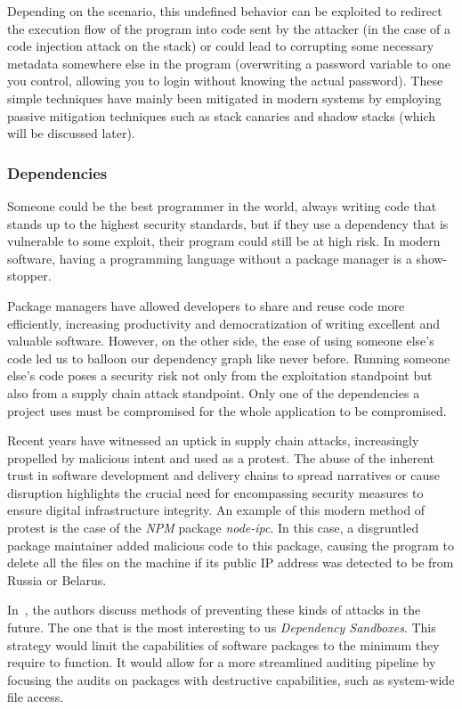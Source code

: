 \documentclass{article}
\begin{document}
Depending on the scenario, this undefined behavior can be exploited to redirect the execution flow of the program into code sent by the attacker (in the case of a code injection attack on the stack) or could lead to corrupting some necessary metadata somewhere else in the program (overwriting a password variable to one you control, allowing you to login without knowing the actual password). These simple techniques have mainly been mitigated in modern systems by employing passive mitigation techniques such as stack canaries and shadow stacks (which will be discussed later).

\subsubsection{Dependencies}%
Someone could be the best programmer in the world, always writing code that stands up to the highest security standards, but if they use a dependency that is vulnerable to some exploit, their program could still be at high risk. In modern software, having a programming language without a package manager is a show-stopper.

Package managers have allowed developers to share and reuse code more efficiently, increasing productivity and democratization of writing excellent and valuable software. However, on the other side, the ease of using someone else's code led us to balloon our dependency graph like never before. Running someone else's code poses a security risk not only from the exploitation standpoint but also from a supply chain attack standpoint. Only one of the dependencies a project uses must be compromised for the whole application to be compromised.

Recent years have witnessed an uptick in supply chain attacks, increasingly propelled by malicious intent and used as a protest. The abuse of the inherent trust in software development and delivery chains to spread narratives or cause disruption highlights the crucial need for encompassing security measures to ensure digital infrastructure integrity. An example of this modern method of protest is the case of the \emph{NPM} package \emph{node-ipc}\cite{LunaSec}. In this case, a disgruntled package maintainer added malicious code to this package, causing the program to delete all the files on the machine if its public IP address was detected to be from Russia or Belarus.

In~\cite{LunaSec}, the authors discuss methods of preventing these kinds of attacks in the future. The one that is the most interesting to us \emph{Dependency Sandboxes}. This strategy would limit the capabilities of software packages to the minimum they require to function. It would allow for a more streamlined auditing pipeline by focusing the audits on packages with destructive capabilities, such as system-wide file access.
\end{document}

